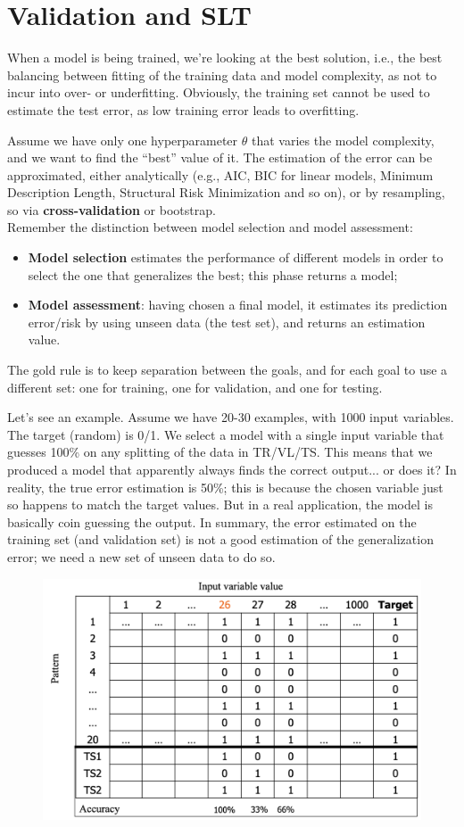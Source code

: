 \chapter{Validation and SLT}

When a model is being trained, we're looking at the best solution, i.e., the best balancing between fitting of the training data and model complexity, as not to incur into over- or underfitting. Obviously, the training set cannot be used to estimate the test error, as low training error leads to overfitting.

Assume we have only one hyperparameter $\theta$ that varies the model complexity, and we want to find the ``best'' value of it. The estimation of the error can be approximated, either analytically (e.g., AIC, BIC for linear models, Minimum Description Length, Structural Risk Minimization and so on), or by resampling, so via \textbf{cross-validation} or bootstrap.\\
Remember the distinction between model selection and model assessment:
\begin{itemize}
    \item \textbf{Model selection} estimates the performance of different models in order to select the one that generalizes the best; this phase returns a model;

    \item \textbf{Model assessment}: having chosen a final model, it estimates its prediction error/risk by using unseen data (the test set), and returns an estimation value.
\end{itemize}
The gold rule is to keep separation between the goals, and for each goal to use a different set: one for training, one for validation, and one for testing.

Let's see an example. Assume we have 20-30 examples, with 1000 input variables. The target (random) is 0/1. We select a model with a single input variable that guesses 100\% on any splitting of the data in TR/VL/TS. This means that we produced a model that apparently always finds the correct output... or does it? In reality, the true error estimation is 50\%; this is because the chosen variable just so happens to match the target values. But in a real application, the model is basically coin guessing the output. In summary, the error estimated on the training set (and validation set) is not a good estimation of the generalization error; we need a new set of unseen data to do so.

\begin{figure}[ht]
    \centering\includegraphics[width=0.5\linewidth]{img/table_counterex.png}
\end{figure}

